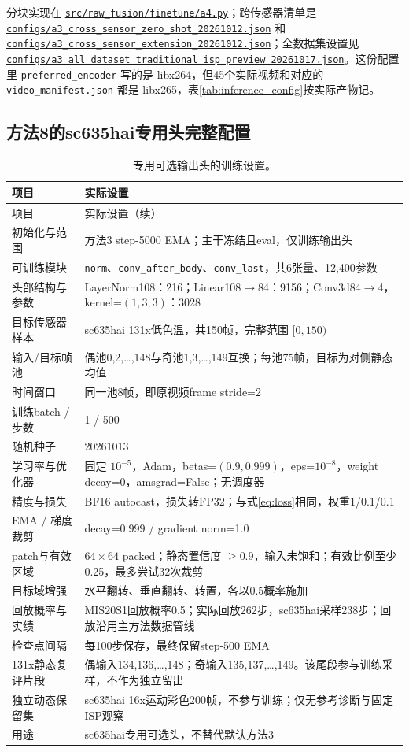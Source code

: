 \documentclass[11pt,a4paper,UTF8,fontset=fandol]{ctexart}
\newcommand{\repofile}[1]{\href{https://github.com/JingZe-Liang/SigmaStar_AIISP/blob/main/Stage2/9_19-10_1/Task3/XWJ/RECOVERED_Stage2_DenoiseModel_20261010/#1}{\nolinkurl{#1}}}
\begin{document}
分块实现在 \repofile{src/raw_fusion/finetune/a4.py}；跨传感器清单是 \repofile{configs/a3_cross_sensor_zero_shot_20261012.json} 和 \repofile{configs/a3_cross_sensor_extension_20261012.json}；全数据集设置见 \repofile{configs/a3_all_dataset_traditional_isp_preview_20261017.json}。这份配置里 \texttt{preferred\_encoder} 写的是 libx264，但45个实际视频和对应的 \texttt{video\_manifest.json} 都是 libx265，表\ref{tab:inference_config}按实际产物记。

\subsection{方法8的sc635hai专用头完整配置}

\begin{longtable}{P{0.27\textwidth}P{0.65\textwidth}}
\caption{专用可选输出头的训练设置。}\label{tab:head_config}\\
\toprule 项目 & 实际设置 \\ \midrule
\endfirsthead
\toprule 项目 & 实际设置（续） \\ \midrule
\endhead
\bottomrule\endfoot
初始化与范围 & 方法3 step-5000 EMA；主干冻结且eval，仅训练输出头 \\
可训练模块 & \texttt{norm}、\texttt{conv\_after\_body}、\texttt{conv\_last}，共6张量、12,400参数 \\
头部结构与参数 & LayerNorm108：216；Linear108$\to$84：9156；Conv3d84$\to$4，kernel=$(1,3,3)$：3028 \\
目标传感器样本 & sc635hai 131x低色温，共150帧，完整范围 $[0,150)$ \\
输入/目标帧池 & 偶池0,2,\ldots,148与奇池1,3,\ldots,149互换；每池75帧，目标为对侧静态均值 \\
时间窗口 & 同一池8帧，即原视频frame stride=2 \\
训练batch / 步数 & 1 / 500 \\
随机种子 & 20261013 \\
学习率与优化器 & 固定 $10^{-5}$，Adam，betas=$(0.9,0.999)$，eps=$10^{-8}$，weight decay=0，amsgrad=False；无调度器 \\
精度与损失 & BF16 autocast，损失转FP32；与式\eqref{eq:loss}相同，权重1/0.1/0.1 \\
EMA / 梯度裁剪 & decay=0.999 / gradient norm=1.0 \\
patch与有效区域 & $64\times64$ packed；静态置信度 $\ge0.9$，输入未饱和；有效比例至少0.25，最多尝试32次裁剪 \\
目标域增强 & 水平翻转、垂直翻转、转置，各以0.5概率施加 \\
回放概率与实绩 & MIS20S1回放概率0.5；实际回放262步，sc635hai采样238步；回放沿用主方法数据管线 \\
检查点间隔 & 每100步保存，最终保留step-500 EMA \\
131x静态复评片段 & 偶输入134,136,\ldots,148；奇输入135,137,\ldots,149。该尾段参与训练采样，不作为独立留出 \\
独立动态保留集 & sc635hai 16x运动彩色200帧，不参与训练；仅无参考诊断与固定ISP观察 \\
用途 & sc635hai专用可选头，不替代默认方法3 \\
\end{longtable}
\end{document}
